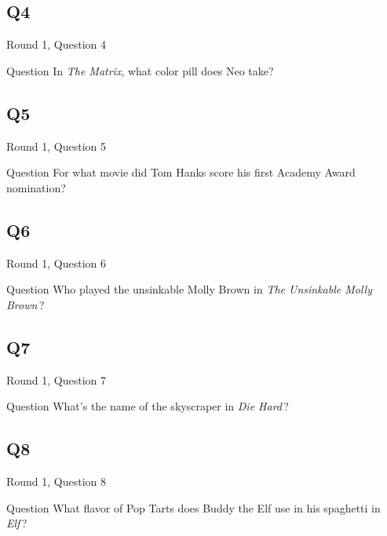 \documentclass[11pt]{beamer}
\begin{document}
\subsection*{Q4}
\begin{frame}[t]{Round 1, Question 4}
\vspace{2em}
\begin{block}{Question}
In \emph{The Matrix}, what color pill does Neo take?
\end{block}
\end{frame}
    

\subsection*{Q5}
\begin{frame}[t]{Round 1, Question 5}
\vspace{2em}
\begin{block}{Question}
For what movie did Tom Hanks score his first Academy Award nomination?
\end{block}
\end{frame}
    

\subsection*{Q6}
\begin{frame}[t]{Round 1, Question 6}
\vspace{2em}
\begin{block}{Question}
Who played the unsinkable Molly Brown in \emph{The Unsinkable Molly Brown}\,?
\end{block}
\end{frame}
    

\subsection*{Q7}
\begin{frame}[t]{Round 1, Question 7}
\vspace{2em}
\begin{block}{Question}
What's the name of the skyscraper in \emph{Die Hard}\,?
\end{block}
\end{frame}
    

\subsection*{Q8}
\begin{frame}[t]{Round 1, Question 8}
\vspace{2em}
\begin{block}{Question}
What flavor of Pop Tarts does Buddy the Elf use in his spaghetti in \emph{Elf}\,?
\end{block}
\end{frame}
    
\end{document}

